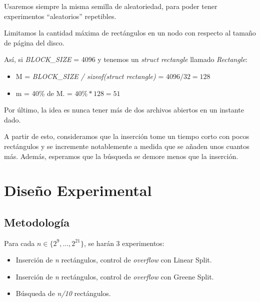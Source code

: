 \documentclass[letterpaper,10pt]{article}
\begin{document}
	Usaremos siempre la misma semilla de aleatoriedad, para poder tener experimentos ``aleatorios'' repetibles.

	Limitamos la cantidad máxima de rectángulos en un nodo con respecto al tamaño de página del disco.

	Así, si \textit{BLOCK\_SIZE} = 4096 y tenemos un \textit{struct rectangle} llamado \textit{Rectangle}:

	\begin{itemize}
		\item M = \textit{BLOCK\_SIZE / sizeof(struct rectangle)} = $ 4096 / 32 = 128 $
		\item m = 40\% de M. = $ 40\% * 128 = 51 $
	\end{itemize}

	Por último, la idea es nunca tener más de dos archivos abiertos en un instante dado.

	A partir de esto, consideramos que la inserción tome un tiempo corto con pocos rectángulos y se incremente notablemente a medida que se añaden unos cuantos más.
	Además, esperamos que la búsqueda se demore menos que la inserción.

	\newpage

	\section{Diseño Experimental}

	\subsection{Metodología}

	Para cada $n \in \{2^{9}, ..., 2^{21}\}$, se harán 3 experimentos:

	\begin{itemize}
		\item Inserción de \textit{n} rectángulos, control de \textit{overflow} con Linear Split.
		\item Inserción de \textit{n} rectángulos, control de \textit{overflow} con Greene Split.
		\item Búsqueda de \textit{n/10} rectángulos.
	\end{itemize}
\end{document}
